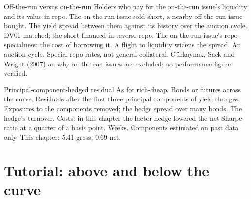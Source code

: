 \begin{strategyfile}{Off-the-run versus on-the-run}\label{strat:s2:government-bond-relative-value:otr}
 Holders who pay for the on-the-run issue's liquidity and its value in repo.
 The on-the-run issue sold short, a nearby off-the-run issue bought.
 The yield spread between them against its history over the auction cycle.
 DV01-matched; the short financed in reverse repo.
 The on-the-run issue's repo specialness: the cost of borrowing it.
 A flight to liquidity widens the spread.
 An auction cycle.
 Special repo rates, not general collateral.
 Gürkaynak, Sack and Wright (2007) on why on-the-run issues are excluded; no performance figure verified.
\end{strategyfile}

\begin{strategyfile}{Principal-component-hedged residual}\label{strat:s2:government-bond-relative-value:pca}
 As for rich-cheap.
 Bonds or futures across the curve.
 Residuals after the first three principal components of yield changes.
 Exposures to the components removed; the hedge spread over many bonds.
 The hedge's turnover.
 Costs: in this chapter the factor hedge lowered the net Sharpe ratio at a quarter of a basis point.
 Weeks.
 Components estimated on past data only.
 This chapter: 5.41 gross, 0.69 net.
\end{strategyfile}

\section{Tutorial: above and below the curve}\label{tut:s2:government-bond-relative-value:tut}

